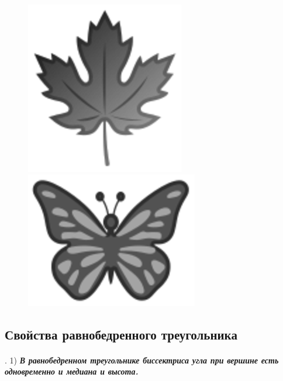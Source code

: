 \begin{figure}[h!]
\begin{minipage}{.48\textwidth}
\centering
\includegraphics{eps/klenovyj-list}
\end{minipage}\hfill
\begin{minipage}{.48\textwidth}
\centering
\includegraphics{eps/babochka}
\end{minipage}

\medskip

\begin{minipage}{.48\textwidth}
\centering
\caption{}\label{1938/ris-42}
\end{minipage}\hfill
\begin{minipage}{.48\textwidth}
\centering
\caption{}\label{1938/ris-43}
\end{minipage}
\vskip-4mm
\end{figure}

\subsection*{Свойства равнобедренного треугольника}

\paragraph{}\label{1938/38}
.
1) \textbf{\emph{В равнобедренном треугольнике биссектриса угла при вершине есть одновременно и медиана и высота.}}

